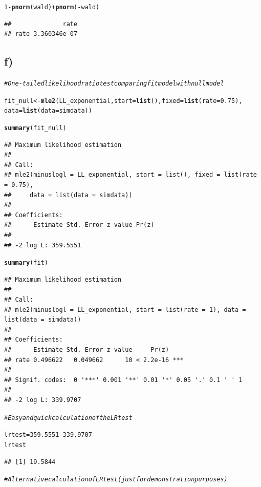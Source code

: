 \documentclass[12pt]{article}\usepackage[]{graphicx}\usepackage[]{color}
\makeatletter
\newcommand{\hlnum}[1]{\textcolor[rgb]{0.686,0.059,0.569}{#1}}%
\newcommand{\hlcom}[1]{\textcolor[rgb]{0.678,0.584,0.686}{\textit{#1}}}%
\newcommand{\hlopt}[1]{\textcolor[rgb]{0,0,0}{#1}}%
\newcommand{\hlstd}[1]{\textcolor[rgb]{0.345,0.345,0.345}{#1}}%
\newcommand{\hlkwb}[1]{\textcolor[rgb]{0.69,0.353,0.396}{#1}}%
\newcommand{\hlkwc}[1]{\textcolor[rgb]{0.333,0.667,0.333}{#1}}%
\newcommand{\hlkwd}[1]{\textcolor[rgb]{0.737,0.353,0.396}{\textbf{#1}}}%
\newenvironment{kframe}{%
 \def\at@end@of@kframe{}%
 \ifinner\ifhmode%
  \def\at@end@of@kframe{\end{minipage}}%
  \begin{minipage}{\columnwidth}%
 \fi\fi%
 \def\FrameCommand##1{\hskip\@totalleftmargin \hskip-\fboxsep
 \colorbox{shadecolor}{##1}\hskip-\fboxsep
     \hskip-\linewidth \hskip-\@totalleftmargin \hskip\columnwidth}%
 \MakeFramed {\advance\hsize-\width
   \@totalleftmargin\z@ \linewidth\hsize
   \@setminipage}}%
 {\par\unskip\endMakeFramed%
 \at@end@of@kframe}
\newenvironment{knitrout}{}{} %
\makeatother
\begin{document}
\begin{knitrout}
\begin{kframe}
\begin{alltt}
\hlnum{1} \hlopt{-} \hlkwd{pnorm}\hlstd{(wald)} \hlopt{+} \hlkwd{pnorm}\hlstd{(}\hlopt{-}\hlstd{wald)}
\end{alltt}
\begin{verbatim}
##              rate
## rate 3.360346e-07
\end{verbatim}
\end{kframe}
\end{knitrout}

\subsection*{f)}

\begin{knitrout}
\color{fgcolor}\begin{kframe}
\begin{alltt}
\hlcom{# One-tailed likelihood ratio test comparing fit model with null model}

\hlstd{fit_null} \hlkwb{<-} \hlkwd{mle2}\hlstd{(LL_exponential,} \hlkwc{start} \hlstd{=} \hlkwd{list}\hlstd{(),} \hlkwc{fixed} \hlstd{=} \hlkwd{list}\hlstd{(}\hlkwc{rate} \hlstd{=} \hlnum{0.75}\hlstd{),}
    \hlkwc{data} \hlstd{=} \hlkwd{list}\hlstd{(}\hlkwc{data} \hlstd{= simdata))}

\hlkwd{summary}\hlstd{(fit_null)}
\end{alltt}
\begin{verbatim}
## Maximum likelihood estimation
## 
## Call:
## mle2(minuslogl = LL_exponential, start = list(), fixed = list(rate = 0.75), 
##     data = list(data = simdata))
## 
## Coefficients:
##      Estimate Std. Error z value Pr(z)
## 
## -2 log L: 359.5551
\end{verbatim}
\begin{alltt}
\hlkwd{summary}\hlstd{(fit)}
\end{alltt}
\begin{verbatim}
## Maximum likelihood estimation
## 
## Call:
## mle2(minuslogl = LL_exponential, start = list(rate = 1), data = list(data = simdata))
## 
## Coefficients:
##      Estimate Std. Error z value     Pr(z)    
## rate 0.496622   0.049662      10 < 2.2e-16 ***
## ---
## Signif. codes:  0 '***' 0.001 '**' 0.01 '*' 0.05 '.' 0.1 ' ' 1
## 
## -2 log L: 339.9707
\end{verbatim}
\begin{alltt}
\hlcom{# Easy and quick calculation of the LR test}

\hlstd{lrtest} \hlkwb{=} \hlnum{359.5551} \hlopt{-} \hlnum{339.9707}
\hlstd{lrtest}
\end{alltt}
\begin{verbatim}
## [1] 19.5844
\end{verbatim}
\begin{alltt}
\hlcom{# Alternative calculation of LR test (just for demonstration purposes)}


\end{alltt}
\end{kframe}
\end{knitrout}
\end{document}
